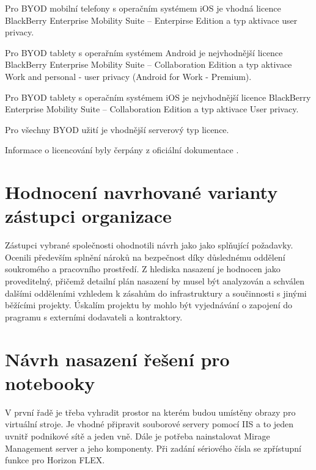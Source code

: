 Pro BYOD mobilní telefony s operačním systémem iOS je vhodná licence BlackBerry Enterprise Mobility Suite -- Enterpirse Edition a typ aktivace user privacy.

Pro BYOD tablety s operařním systémem Android je nejvhodnější licence BlackBerry Enterprise Mobility Suite -- Collaboration Edition a typ aktivace Work and personal - user privacy (Android for Work - Premium).

Pro BYOD tablety s operačním systémem iOS je nejvhodnější licence BlackBerry Enterprise Mobility Suite -- Collaboration Edition a typ aktivace User privacy.

Pro všechny BYOD užití je vhodnější serverový typ licence.

Informace o licencování byly čerpány z oficiální dokumentace .

\section{Hodnocení navrhované varianty zástupci organizace}
Zástupci vybrané společnosti ohodnotili návrh jako jako splňující požadavky. Ocenili především splnění nároků na bezpečnost díky důslednému oddělení soukromého a pracovního prostředí. Z hlediska nasazení je hodnocen jako proveditelný, přičemž detailní plán nasazení by musel být analyzován a schválen dalšími odděleními vzhledem k zásahům do infrastruktury a součinnosti s jinými běžícími projekty. 
Úskalím projektu by mohlo být vyjednávání o zapojení do pragramu s externími dodavateli a kontraktory.

\section{Návrh nasazení řešení pro notebooky}

V první řadě je třeba vyhradit prostor na kterém budou umístěny obrazy pro virtuální stroje. Je vhodné připravit souborové servery pomocí IIS a to jeden uvnitř podnikové sítě a jeden vně. Dále je potřeba nainstalovat Mirage Management server a jeho komponenty. Při zadání sériového čísla se zpřístupní funkce pro Horizon FLEX. 

